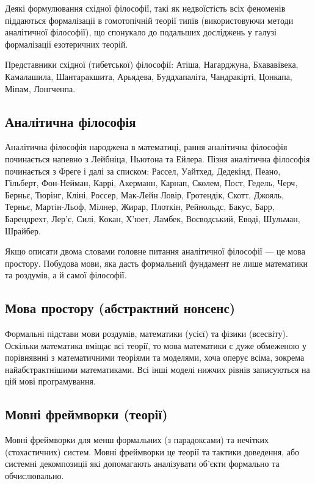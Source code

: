 Деякі формулювання східної філософії, такі як недвоїстість всіх
феноменів піддаються формалізації в гомотопічній теорії типів (використовуючи
методи аналітичної філософії), що спонукало до подальших досліджень
у галузі формалізації езотеричних теорій.

Представники східної (тибетської) філософії: Атіша, Нагарджуна,
Бхававівека, Камалашила, Шантаpакшита, Арьядева, Бyддхапаліта,
Чандракірті, Цонкапа, Міпам, Лонгченпа.

\subsection*{Аналітична філософія}

Аналітична філософія народжена в математиці, рання аналітична
філософія починається напевно з Лейбніца, Ньютона та Ейлера.
Пізня аналітична філософія починається з Фреге і далі за списком:
Рассел, Уайтхед, Дедекінд, Пеано, Гільберт, Фон-Нейман, Каррі,
Акерманн, Карнап, Сколем, Пост, Гедель, Черч, Берньє, Тюрінг,
Кліні, Россер, Мак-Лейн Ловір, Гротендік, Скотт, Джояль, Терньє,
Мартін-Льоф, Мілнер, Жирар, Плоткін, Рейнольдс, Бакус, Барр, Барендрехт,
Лер'є, Силі, Кокан, Х'юет, Ламбек, Воєводський, Еводі, Шульман, Шрайбер.

Якщо описати двома словами головне питання аналітичної
філософії --- це мова простору. Побудова мови, яка дасть
формальний фундамент не лише математики та роздумів, а й самої філософії.

\subsection*{Мова простору (абстрактний нонсенс)}

Формальні підстави мови роздумів, математики (усієї) та
фізики (всесвіту). Оскільки математика вміщає всі теорії,
то мова математики є дуже обмеженою у порівнявнні з математичними
теоріями та моделями, хоча оперує всіма, зокрема найабстрактнішими
математиками. Всі інші моделі нижчих рівнів записуються на цій мові програмування.

\subsection*{Мовні фреймворки (теорії)}

Мовні фреймворки для менш формальних (з парадоксами) та нечітких (стохастичних) систем.
Мовні фреймворки це теорії та тактики доведення, або системні декомпозиції
які допомагають аналізувати об'єкти формально та обчислювально.

